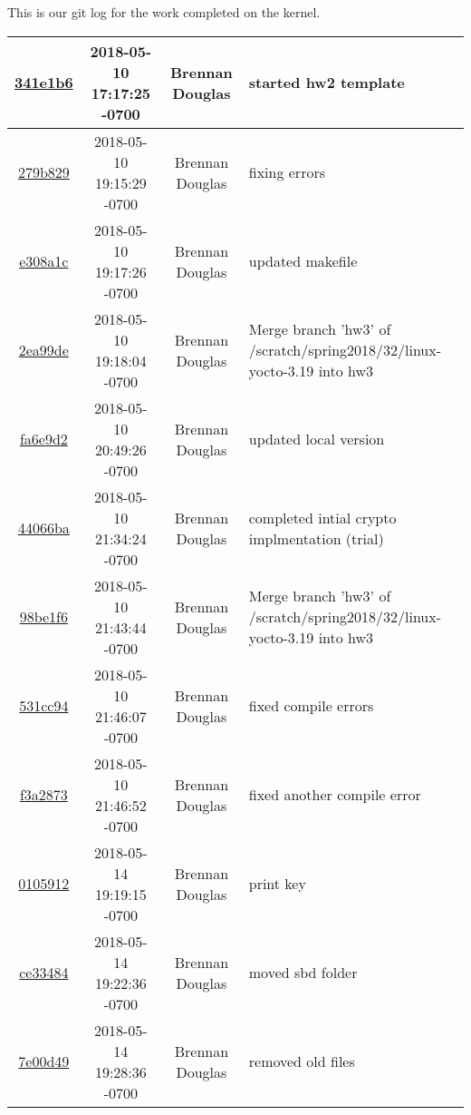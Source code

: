 \documentclass[onecolumn, draftclsnofoot,10pt, compsoc]{IEEEtran}
\begin{document}
This is our git log for the work completed on the kernel.

\begin{center}
	\begin{tabular}{ |c|c|c|p{8cm}| }
	    \hline
		\href{git://git.yoctoproject.org/linux-yocto-3.19/commit/341e1b6122797e25c446bd84dda4473c504f60f6}{341e1b6} & 2018-05-10 17:17:25 -0700 & Brennan Douglas & started hw2 template\\\hline
        \href{git://git.yoctoproject.org/linux-yocto-3.19/commit/279b829994a2c1ff996bb2a5bb441e57bffe3df9}{279b829} & 2018-05-10 19:15:29 -0700 & Brennan Douglas & fixing errors\\\hline
        \href{git://git.yoctoproject.org/linux-yocto-3.19/commit/e308a1ccd4142f64d2e568b4dd9de92b7b2f901a}{e308a1c} & 2018-05-10 19:17:26 -0700 & Brennan Douglas & updated makefile\\\hline
        \href{git://git.yoctoproject.org/linux-yocto-3.19/commit/2ea99de6eeaade10b70a8e8ad822405d25f6eda7}{2ea99de} & 2018-05-10 19:18:04 -0700 & Brennan Douglas & Merge branch 'hw3' of /scratch/spring2018/32/linux-yocto-3.19 into hw3\\\hline
        \href{git://git.yoctoproject.org/linux-yocto-3.19/commit/fa6e9d2989c0c9752a38e7fdefd87ee304b781cc}{fa6e9d2} & 2018-05-10 20:49:26 -0700 & Brennan Douglas & updated local version\\\hline
        \href{git://git.yoctoproject.org/linux-yocto-3.19/commit/44066bafc858595ea95bd7227cc6637673cb7eed}{44066ba} & 2018-05-10 21:34:24 -0700 & Brennan Douglas & completed intial crypto implmentation (trial)\\\hline
        \href{git://git.yoctoproject.org/linux-yocto-3.19/commit/98be1f6e76096fc17a2c40f06f5081b327382c4f}{98be1f6} & 2018-05-10 21:43:44 -0700 & Brennan Douglas & Merge branch 'hw3' of /scratch/spring2018/32/linux-yocto-3.19 into hw3\\\hline
        \href{git://git.yoctoproject.org/linux-yocto-3.19/commit/531cc94eb8a2cabb87476638d7c28d4fba04f059}{531cc94} & 2018-05-10 21:46:07 -0700 & Brennan Douglas & fixed compile errors\\\hline
        \href{git://git.yoctoproject.org/linux-yocto-3.19/commit/f3a2873b2a5e76ebd3b8aea81ec216c84eea93d7}{f3a2873} & 2018-05-10 21:46:52 -0700 & Brennan Douglas & fixed another compile error\\\hline
        \href{git://git.yoctoproject.org/linux-yocto-3.19/commit/0105912e9f4f6655a68849b077efb268900fa01a}{0105912} & 2018-05-14 19:19:15 -0700 & Brennan Douglas & print key\\\hline
        \href{git://git.yoctoproject.org/linux-yocto-3.19/commit/ce33484d115c12f0e2824d76c6aebc021604f82a}{ce33484} & 2018-05-14 19:22:36 -0700 & Brennan Douglas & moved sbd folder\\\hline
        \href{git://git.yoctoproject.org/linux-yocto-3.19/commit/7e00d491c226440323006259b1feca61f0cd65cf}{7e00d49} & 2018-05-14 19:28:36 -0700 & Brennan Douglas & removed old files\\\hline
	\end{tabular}
\end{center}
\end{document}
